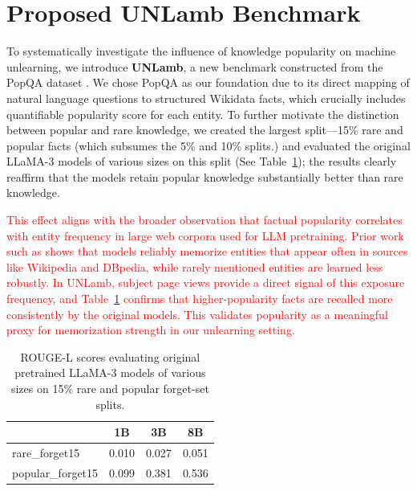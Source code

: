 \documentclass[sigconf,anonymous]{aamas}
\begin{document}
\section{Proposed UNLamb Benchmark}
\label{sec:benchmark}

To systematically investigate the influence of knowledge popularity on machine unlearning, we introduce \textbf{UNLamb}, a new benchmark constructed from the PopQA dataset \cite{mallen2023not}. We chose PopQA as our foundation due to its direct mapping of natural language questions to structured Wikidata facts, which crucially includes quantifiable popularity score for each entity.
To further motivate the distinction between popular and rare knowledge, we created the largest split—15\% rare and popular facts (which subsumes the 5\% and 10\% splits.)
and evaluated the original LLaMA-3 models of various sizes on this split (See Table~\ref{tab:orig_forget15_by_size}); the results clearly reaffirm that the models retain popular knowledge substantially better than rare knowledge.


\textcolor{red}{
This effect aligns with the broader observation that factual popularity correlates with entity frequency in large web corpora used for LLM pretraining. Prior work such as \cite{sun2023head} shows that models reliably memorize entities that appear often in sources like Wikipedia and DBpedia, while rarely mentioned entities are learned less robustly. In UNLamb, subject page views provide a direct signal of this exposure frequency, and Table~\ref{tab:orig_forget15_by_size} confirms that higher-popularity facts are recalled more consistently by the original models. This validates popularity as a meaningful proxy for memorization strength in our unlearning setting.
}


\begin{table}[h!t]
\caption{ROUGE-L scores evaluating original pretrained LLaMA-3 models of various sizes on 15\% rare and popular forget-set splits.}
  \label{tab:orig_forget15_by_size}
  \centering
  \small
  \setlength{\tabcolsep}{6pt}
  \begin{tabular}{lccc}
    \hline
     & \textbf{1B} & \textbf{3B} & \textbf{8B} \\ 
    \hline
    rare\_forget15 & 0.010 & 0.027 & 0.051 \\
    \hline
    popular\_forget15 & 0.099 & 0.381 & 0.536 \\
    \hline
  \end{tabular}
  
\end{table}
\end{document}
